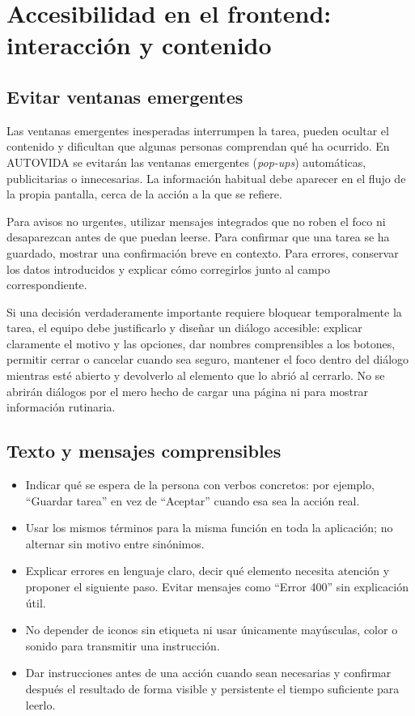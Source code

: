 \section{Accesibilidad en el frontend: interacción y contenido}

\subsection{Evitar ventanas emergentes}
Las ventanas emergentes inesperadas interrumpen la tarea, pueden ocultar el contenido y dificultan que algunas personas comprendan qué ha ocurrido. En AUTOVIDA se evitarán las ventanas emergentes (\textit{pop-ups}) automáticas, publicitarias o innecesarias. La información habitual debe aparecer en el flujo de la propia pantalla, cerca de la acción a la que se refiere.

Para avisos no urgentes, utilizar mensajes integrados que no roben el foco ni desaparezcan antes de que puedan leerse. Para confirmar que una tarea se ha guardado, mostrar una confirmación breve en contexto. Para errores, conservar los datos introducidos y explicar cómo corregirlos junto al campo correspondiente.

Si una decisión verdaderamente importante requiere bloquear temporalmente la tarea, el equipo debe justificarlo y diseñar un diálogo accesible: explicar claramente el motivo y las opciones, dar nombres comprensibles a los botones, permitir cerrar o cancelar cuando sea seguro, mantener el foco dentro del diálogo mientras esté abierto y devolverlo al elemento que lo abrió al cerrarlo. No se abrirán diálogos por el mero hecho de cargar una página ni para mostrar información rutinaria.

\subsection{Texto y mensajes comprensibles}
\begin{itemize}[leftmargin=*]
  \item Indicar qué se espera de la persona con verbos concretos: por ejemplo, ``Guardar tarea'' en vez de ``Aceptar'' cuando esa sea la acción real.
  \item Usar los mismos términos para la misma función en toda la aplicación; no alternar sin motivo entre sinónimos.
  \item Explicar errores en lenguaje claro, decir qué elemento necesita atención y proponer el siguiente paso. Evitar mensajes como ``Error 400'' sin explicación útil.
  \item No depender de iconos sin etiqueta ni usar únicamente mayúsculas, color o sonido para transmitir una instrucción.
  \item Dar instrucciones antes de una acción cuando sean necesarias y confirmar después el resultado de forma visible y persistente el tiempo suficiente para leerlo.
\end{itemize}

